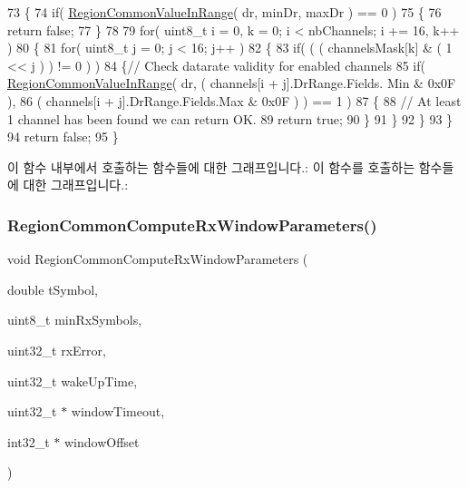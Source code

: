 \begin{DoxyCode}
73 \{
74     \textcolor{keywordflow}{if}( \mbox{\hyperlink{group___r_e_g_i_o_n_c_o_m_m_o_n_gafdd1c80d953e18d755a631b72a9c3bd3}{RegionCommonValueInRange}}( dr, minDr, maxDr ) == 0 )
75     \{
76         \textcolor{keywordflow}{return} \textcolor{keyword}{false};
77     \}
78 
79     \textcolor{keywordflow}{for}( uint8\_t i = 0, k = 0; i < nbChannels; i += 16, k++ )
80     \{
81         \textcolor{keywordflow}{for}( uint8\_t j = 0; j < 16; j++ )
82         \{
83             \textcolor{keywordflow}{if}( ( ( channelsMask[k] & ( 1 << j ) ) != 0 ) )
84             \{\textcolor{comment}{// Check datarate validity for enabled channels}
85                 \textcolor{keywordflow}{if}( \mbox{\hyperlink{group___r_e_g_i_o_n_c_o_m_m_o_n_gafdd1c80d953e18d755a631b72a9c3bd3}{RegionCommonValueInRange}}( dr, ( channels[i + j].DrRange.Fields.
      Min & 0x0F ),
86                                                   ( channels[i + j].DrRange.Fields.Max & 0x0F ) ) == 1 )
87                 \{
88                     \textcolor{comment}{// At least 1 channel has been found we can return OK.}
89                     \textcolor{keywordflow}{return} \textcolor{keyword}{true};
90                 \}
91             \}
92         \}
93     \}
94     \textcolor{keywordflow}{return} \textcolor{keyword}{false};
95 \}
\end{DoxyCode}
이 함수 내부에서 호출하는 함수들에 대한 그래프입니다.\+:
이 함수를 호출하는 함수들에 대한 그래프입니다.\+:
\mbox{\label{group___r_e_g_i_o_n_c_o_m_m_o_n_gaba7114d0ca01f04933710feb13646138}} 
\subsubsection{\texorpdfstring{Region\+Common\+Compute\+Rx\+Window\+Parameters()}{RegionCommonComputeRxWindowParameters()}}
{\footnotesize\ttfamily void Region\+Common\+Compute\+Rx\+Window\+Parameters (\begin{DoxyParamCaption}\item[{double}]{t\+Symbol,  }\item[{uint8\+\_\+t}]{min\+Rx\+Symbols,  }\item[{uint32\+\_\+t}]{rx\+Error,  }\item[{uint32\+\_\+t}]{wake\+Up\+Time,  }\item[{uint32\+\_\+t $\ast$}]{window\+Timeout,  }\item[{int32\+\_\+t $\ast$}]{window\+Offset }\end{DoxyParamCaption})}



